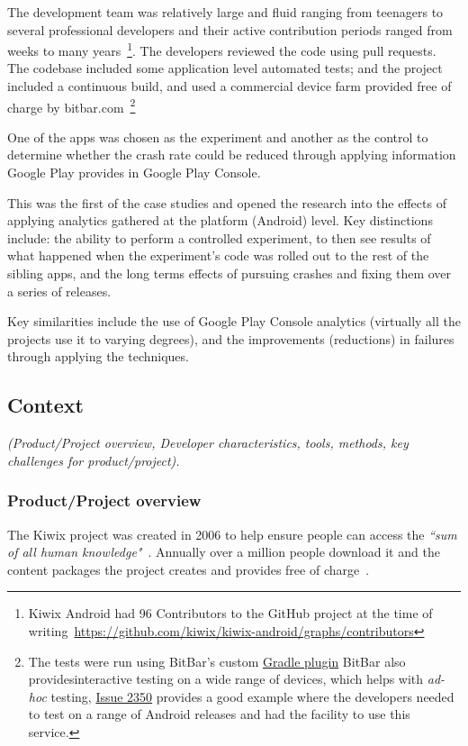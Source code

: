 The development team was relatively large and fluid ranging from teenagers to several professional developers and their active contribution periods ranged from weeks to many years~\footnote{Kiwix Android had 96 Contributors to the GitHub project at the time of writing~\url{https://github.com/kiwix/kiwix-android/graphs/contributors}}. The developers reviewed the code using pull requests.  The codebase included some application level automated tests; and the project included a continuous build, and used a commercial device farm provided free of charge by bitbar.com~\footnote{The tests were run using BitBar's custom \href{https://support.smartbear.com/bitbar/docs/integrations/gradle.html}{Gradle plugin} BitBar also providesinteractive testing on a wide range of devices, which helps with \emph{ad-hoc} testing, \href{https://github.com/kiwix/kiwix-android/pull/2350}{Issue 2350} provides a good example where the developers needed to test on a range of Android releases and had the facility to use this service.} 

One of the apps was chosen as the experiment and another as the control to determine whether the crash rate could be reduced through applying information Google Play provides in Google Play Console.

This was the first of the case studies and opened the research into the effects of applying analytics gathered at the platform (Android) level. Key distinctions include: the ability to perform a controlled experiment, to then see results of what happened when the experiment’s code was rolled out to the rest of the sibling apps, and the long terms effects of pursuing crashes and fixing them over a series of releases.

Key similarities include the use of Google Play Console analytics (virtually all the projects use it to varying degrees), and the improvements (reductions) in failures through applying the techniques. 


\subsection{Context}
\textit{(Product/Project overview, Developer characteristics, tools, methods, key challenges for product/project).}

\subsubsection{Product/Project overview}
The Kiwix project was created in 2006 to help ensure people can access the \emph{``sum of all human knowledge"}~\citep{coillet2016-wikimedia-kiwix-ten-years}. Annually over a million people download it and the content packages the project creates and provides free of charge~\citep{coillet2016-wikimedia-kiwix-ten-years}.

